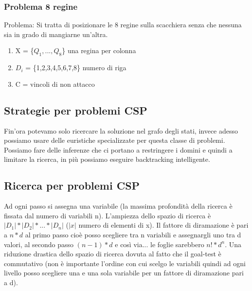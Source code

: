 \documentclass{article}
\begin{document}
\subsubsection{Problema 8 regine}
Problema: Si tratta di posizionare le 8 regine sulla scacchiera senza che nessuna sia in grado di mangiarne un'altra.
\begin{enumerate}
    \item X = \{$Q_1, ..., Q_8$\} \quad una regina per colonna
    \item $D_i$ = \{1,2,3,4,5,6,7,8\} \quad numero di riga
    \item C = vincoli di non attacco
\end{enumerate}

\subsection{Strategie per problemi CSP}
Fin'ora potevamo solo ricercare la soluzione nel grafo degli stati, invece adesso possiamo usare delle euristiche specializzate per questa classe di problemi. Possiamo fare delle inferenze che ci portano a restringere i domini e quindi a limitare la ricerca, in più possiamo eseguire backtracking intelligente.

\subsection{Ricerca per problemi CSP}
Ad ogni passo si assegna una variabile (la massima profondità della ricerca è fissata dal numero di variabili n). L’ampiezza dello spazio di ricerca è $|D_1| * |D_2| * ... * |D_n|$ ($|x|$ numero di elementi di x). Il fattore di diramazione è pari a $n*d$ al primo passo cioè posso scegliere tra n variabili e assegnargli uno tra d valori, al secondo passo $(n-1)*d$ e così via... le foglie sarebbero $n! * d^n$. Una riduzione drastica dello spazio di ricerca dovuta al fatto che il goal-test è commutativo (non è importante l’ordine con cui scelgo le variabili quindi ad ogni livello posso scegliere una e una sola variabile per un fattore di diramazione pari a d).
\end{document}
